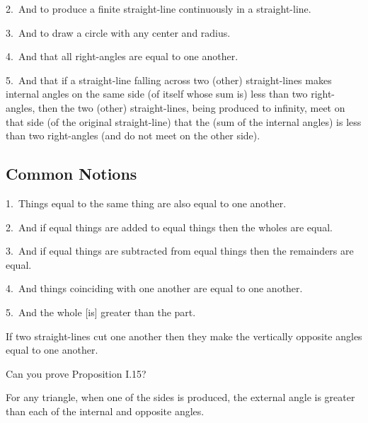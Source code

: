 \documentclass{ximera}
\begin{document}
{2.~And to produce a finite straight-line continuously in a straight-line.

3.~And to draw a circle with any center and radius.

4.~And that all right-angles are equal to one another.

5.~And that if a straight-line falling across two (other) straight-lines makes 
internal angles on the same side (of itself whose sum is) less than two right-angles, then the two (other) straight-lines, being produced to infinity, meet on that side (of the original straight-line) that the (sum of the internal angles) is less
than two right-angles (and do not meet on the other side).



\subsection*{Common Notions}

1.~Things equal to the same thing are also equal to one another.

2.~And  if equal things are added to equal things then the wholes are equal.

3.~And if equal things are subtracted from equal things then the remainders are
equal.

4.~And things coinciding with one another are equal to one another.

5.~And the whole [is] greater than the part.

}


\begin{proposition}[I.15]
If two straight-lines cut one another then they make the vertically
opposite angles equal to one another.
\end{proposition}

\begin{question}
Can you prove Proposition I.15?
\end{question}

\begin{proposition}[I.16]
For any triangle, when one of the sides is produced, the external
angle is greater than each of the internal and opposite angles.
\begin{image}
\end{image}
\end{proposition}
\end{document}
